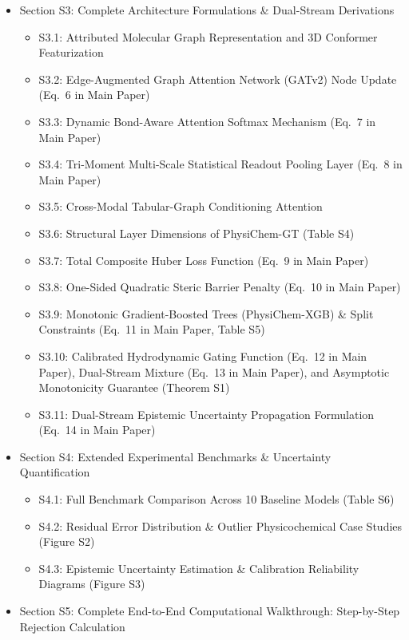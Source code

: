 \documentclass[11pt]{article}
\begin{document}
\begin{itemize}[leftmargin=1.5cm, label=$\blacktriangleright$]
\begin{itemize}[label=$\circ$]
    \end{itemize}
    \item Section S3: Complete Architecture Formulations \& Dual-Stream Derivations
    \begin{itemize}[label=$\circ$]
        \item S3.1: Attributed Molecular Graph Representation and 3D Conformer Featurization
        \item S3.2: Edge-Augmented Graph Attention Network (GATv2) Node Update (Eq.~6 in Main Paper)
        \item S3.3: Dynamic Bond-Aware Attention Softmax Mechanism (Eq.~7 in Main Paper)
        \item S3.4: Tri-Moment Multi-Scale Statistical Readout Pooling Layer (Eq.~8 in Main Paper)
        \item S3.5: Cross-Modal Tabular-Graph Conditioning Attention
        \item S3.6: Structural Layer Dimensions of PhysiChem-GT (Table S4)
        \item S3.7: Total Composite Huber Loss Function (Eq.~9 in Main Paper)
        \item S3.8: One-Sided Quadratic Steric Barrier Penalty (Eq.~10 in Main Paper)
        \item S3.9: Monotonic Gradient-Boosted Trees (PhysiChem-XGB) \& Split Constraints (Eq.~11 in Main Paper, Table S5)
        \item S3.10: Calibrated Hydrodynamic Gating Function (Eq.~12 in Main Paper), Dual-Stream Mixture (Eq.~13 in Main Paper), and Asymptotic Monotonicity Guarantee (Theorem S1)
        \item S3.11: Dual-Stream Epistemic Uncertainty Propagation Formulation (Eq.~14 in Main Paper)
    \end{itemize}
    \item Section S4: Extended Experimental Benchmarks \& Uncertainty Quantification
    \begin{itemize}[label=$\circ$]
        \item S4.1: Full Benchmark Comparison Across 10 Baseline Models (Table S6)
        \item S4.2: Residual Error Distribution \& Outlier Physicochemical Case Studies (Figure S2)
        \item S4.3: Epistemic Uncertainty Estimation \& Calibration Reliability Diagrams (Figure S3)
    \end{itemize}
    \item Section S5: Complete End-to-End Computational Walkthrough: Step-by-Step Rejection Calculation

\end{itemize}
\end{document}

